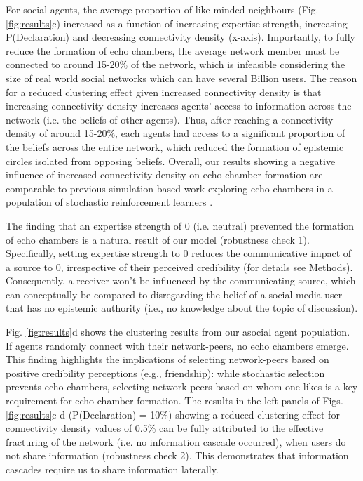 \documentclass[fleqn,10pt]{wlscirep}
\begin{document}
For social agents, the average proportion of like-minded neighbours (Fig. \ref{fig:results}c) increased as a function of increasing expertise strength, increasing P(Declaration) and decreasing connectivity density (x-axis). Importantly, to fully reduce the formation of echo chambers, the average network member must be connected to around 15-20\% of the network, which is infeasible considering the size of real world social networks which can have several Billion users. The reason for a reduced clustering effect given increased connectivity density is that increasing connectivity density increases agents' access to information across the network (i.e. the beliefs of other agents). Thus, after reaching a connectivity density of around 15-20\%, each agents had access to a significant proportion of the beliefs across the entire network, which reduced the formation of epistemic circles isolated from opposing beliefs. Overall, our results showing a negative influence of increased connectivity density on echo chamber formation are comparable to previous simulation-based work exploring echo chambers in a population of stochastic reinforcement learners \cite{pilditch2017opinion}. 


The finding that an expertise strength of 0 (i.e. neutral) prevented the formation of echo chambers is a natural result of our model (robustness check 1). Specifically, setting expertise strength to 0 reduces the communicative impact of a source to 0, irrespective of their perceived credibility (for details see Methods). Consequently, a receiver won't be influenced by the communicating source, which can conceptually be compared to disregarding the belief of a social media user that has no epistemic authority (i.e., no knowledge about the topic of discussion).

Fig. \ref{fig:results}d shows the clustering results from our asocial agent population. If agents randomly connect with their network-peers, no echo chambers emerge. This finding highlights the implications of selecting network-peers based on positive credibility perceptions (e.g., friendship): while stochastic selection prevents echo chambers, selecting network peers based on whom one likes is a key requirement for echo chamber formation. 
The results in the left panels of Figs. \ref{fig:results}c-d (P(Declaration) = 10\%) showing a reduced clustering effect for connectivity density values of 0.5\% can be fully attributed to the effective fracturing of the network (i.e. no information cascade occurred), when users do not share information (robustness check 2). This demonstrates that information cascades require us to share information laterally.
\end{document}
